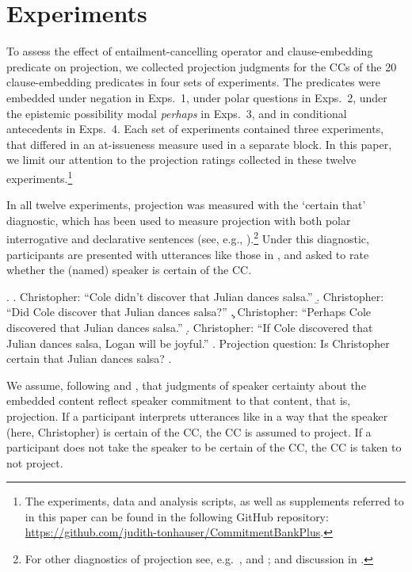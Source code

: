\documentclass[a4paper,12pt,twoside]{article}
\begin{document}
\section{Experiments}\label{s2}
	To assess the effect of entailment-cancelling operator and clause-embedding predicate on projection, we collected projection judgments for the CCs of the 20 clause-embedding predicates in four sets of experiments.
    The predicates were embedded under negation in Exps.~1, under polar questions in Exps.~2, under the epistemic possibility modal {\em perhaps} in Exps.~3, and in conditional antecedents in Exps.~4. Each set of experiments contained three experiments, that differed in an at-issueness measure used in a separate block. In this paper, we limit our attention to the projection ratings collected in these twelve experiments.\footnote{\label{footnote-supplement}The experiments, data and analysis scripts, as well as supplements referred to in this paper can be found in the following GitHub repository: \url{https://github.com/judith-tonhauser/CommitmentBankPlus}.}

	In all twelve experiments, projection was measured with the `certain that' diagnostic, which has been used to measure projection with both polar interrogative and declarative sentences (see, e.g., \citealt{tonhauser_prosodic_2016,djarv_prosodic_2017,stevens_rational_2017,lorson_influence_2018,tonhauser_how_2018,mahler_does_2019,mahler_social_2020,de_marneffe_commitmentbank_2019,sieker_projective_2022}).\footnote{For other diagnostics of projection see, e.g.\ \citealt{smith_projection_2011,xue_correlation_2011}, and \citealt{tonhauser_toward_2013}; and discussion in \citealt{tonhauser_how_2018}.}
    Under this diagnostic, participants are presented with utterances like those in \Next, and asked to rate whether the (named) speaker is certain of the CC. 

	\ex. \label{ex:certain-that}
		\a. Christopher: ``Cole didn't discover that Julian dances salsa.''
		\b. Christopher: ``Did Cole discover that Julian dances salsa?''
		\c. Christopher: ``Perhaps Cole discovered that Julian dances salsa.''
		\d. Christopher: ``If Cole discovered that Julian dances salsa, Logan will be joyful.''
		\z.
		Projection question: Is Christopher certain that Julian dances salsa?
	\z.

    We assume, following \citet{tonhauser_how_2018} and \citet{degen_are_2022}, that judgments of speaker certainty about the embedded content reflect speaker commitment to that content, that is, projection. If a participant interprets utterances like \Last[a--d] in a way that the speaker (here, Christopher) is certain of the CC, the CC is assumed to project. If a participant does not take the speaker to be certain of the CC, the CC is taken to not project.
\end{document}

